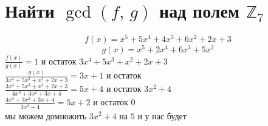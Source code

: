 \documentclass{article}
\newcommand{\ds}{\displaystyle}
\newcommand{\Z}{\mathbb{Z}}
\renewcommand{\f}{\frac}
\begin{document}
  \section{Найти $\gcd(f,\, g)$ над полем $\Z_7$}
  $$ f(x) = x^5 + 5 x^4 + 4 x^3 + 6 x^2 + 2 x + 3 $$
  $$ g(x) = x^5 + 2 x^4 + 6 x^3 + 5 x^2 $$
  $\ds \f{f(x)}{g(x)} = 1 \text{ и остаток } 3 x^4 + 5 x^3 + x^2 + 2 x + 3 $ \\
  $\ds \f{g(x)}{3 x^4 + 5 x^3 + x^2 + 2 x + 3} = 3x + 1 \text{ и остаток } $ \\
  $\ds \f{3 x^4 + 5 x^3 + x^2 + 2 x + 3}{4x^3 + 3x^2 + 3x + 4} = 5x + 4 \text{ и остаток } 3 x^2 + 4 $ \\
  $\ds \f{4x^3 + 3x^2 + 3x + 4}{3 x^2 + 4} = 5x+2 \text{ и остаток } 0 $ \\
  мы можем домножить $3x^2 + 4$ на $5$ и у нас будет 
\end{document}
